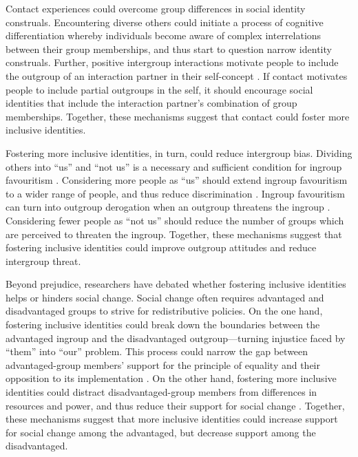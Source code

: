 \documentclass[12pt, a4paper]{article}
\begin{document}
Contact experiences could overcome group differences in social identity construals. Encountering diverse others could initiate a process of cognitive differentiation \cite{schmid_social_2011} whereby individuals become aware of complex interrelations between their group memberships, and thus start to question narrow identity construals. Further, positive intergroup interactions motivate people to include the outgroup of an interaction partner in their self-concept \cite{page_understanding_2010}. If contact motivates people to include partial outgroups in the self, it should encourage social identities that include the interaction partner's combination of group memberships. Together, these mechanisms suggest that contact could foster more inclusive identities.

Fostering more inclusive identities, in turn, could reduce intergroup bias. Dividing others into ``us'' and ``not us'' is a necessary and sufficient condition for ingroup favouritism \cite{tajfel_human_1981}. Considering more people as ``us'' should extend ingroup favouritism to a wider range of people, and thus reduce discrimination \cite{gaertner_common_2016}. Ingroup favouritism can turn into outgroup derogation when an outgroup threatens the ingroup \cite{brewer_psychology_1999}. Considering fewer people as ``not us'' should reduce the number of groups which are perceived to threaten the ingroup. Together, these mechanisms suggest that fostering inclusive identities could improve outgroup attitudes and reduce intergroup threat.

Beyond prejudice, researchers have debated whether fostering inclusive identities helps or hinders social change. Social change often requires advantaged and disadvantaged groups to strive for redistributive policies. On the one hand, fostering inclusive identities could break down the boundaries between the advantaged ingroup and the disadvantaged outgroup---turning injustice faced by ``them'' into ``our'' problem. This process could narrow the gap between advantaged-group members' support for the principle of equality and their opposition to its implementation \cite{dixon_intergroup_2007}. On the other hand, fostering more inclusive identities could distract disadvantaged-group members from differences in resources and power, and thus reduce their support for social change \cite{dovidio_darker_2012}. Together, these mechanisms suggest that more inclusive identities could increase support for social change among the advantaged, but decrease support among the disadvantaged.
\end{document}
